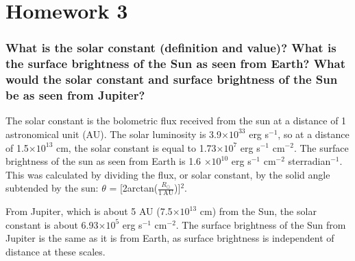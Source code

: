 \documentclass[12pt]{article}
\begin{document}


\section*{Homework 3}
\subsubsection*{What is the solar constant (definition and value)?
    What is the surface brightness of the Sun as seen from Earth?
    What would the solar constant and surface brightness of the Sun
    be as seen from Jupiter?}

    The solar constant is the bolometric flux received from the sun at a
    distance of 1 astronomical unit (AU)\cite{kuhn}.
    The solar luminosity is 3.9$\times10^{33}$ erg s$^{-1}$, so at a distance of
    1.5$\times10^{13}$ cm, the solar constant is equal to
    1.73$\times10^7$ erg s$^{-1}$ cm$^{-2}$.
    The surface brightness of the sun as seen from Earth is
    1.6 $\times10^{10}$ erg s$^{-1}$ cm$^{-2}$ sterradian$^{-1}$.
    This was calculated by dividing the flux, or solar constant, by
    the solid angle subtended by the sun:
    $\theta$ = [2arctan($\frac{R_{\odot}}{1\ \textrm{AU}}$)]$^2$.

    From Jupiter, which is about 5 AU (7.5$\times10^{13}$ cm) from the Sun,
    the solar constant is about 6.93$\times10^5$ erg s$^{-1}$ cm$^{-2}$.
    The surface brightness of the Sun from Jupiter
    is the same as it is from Earth, as
    surface brightness is independent of distance at these scales.


\end{document}
